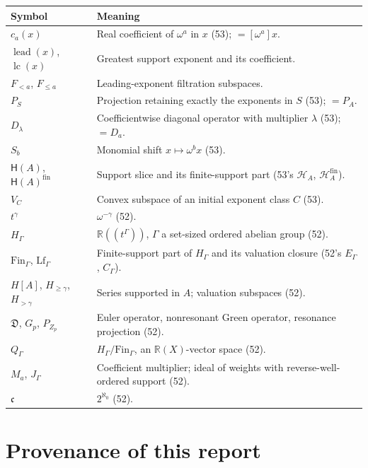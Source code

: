\documentclass[11pt,letterpaper]{article}
\numberwithin{equation}{section}
\theoremstyle{definition}
\theoremstyle{remark}
\newcommand{\R}{\mathbb{R}}
\newcommand{\Hahn}{\mathsf{H}}
\newcommand{\lead}{\operatorname{lead}}
\newcommand{\ct}{\operatorname{ct}}
\newcommand{\lc}{\operatorname{lc}}
\newcommand{\cont}{\mathfrak c}%
\newcommand{\EuD}{\mathfrak D}%
\newcommand{\FinS}[1]{\mathrm{Fin}_{#1}}%
\newcommand{\LfS}[1]{\mathrm{Lf}_{#1}}%
\begin{document}
\begin{center}
\small
\begin{tabularx}{0.96\textwidth}{L{0.24\textwidth}Y}
\toprule
Symbol & Meaning\\
\midrule
\(c_a(x)\) & Real coefficient of \(\omega^a\) in \(x\) (53); \(=[\omega^a]x\).\\
\(\lead(x)\), \(\lc(x)\) & Greatest support exponent and its coefficient.\\
\(F_{<a}\), \(F_{\le a}\) & Leading-exponent filtration subspaces.\\
\(P_S\) & Projection retaining exactly the exponents in \(S\) (53); \(=P_A\).\\
\(D_\lambda\) & Coefficientwise diagonal operator with multiplier \(\lambda\) (53); \(=D_a\).\\
\(S_b\) & Monomial shift \(x\mapsto\omega^bx\) (53).\\
\(\Hahn(A)\), \(\Hahn(A)^{\mathrm{fin}}\) & Support slice and its finite-support part (53's \(\mathcal H_A\), \(\mathcal H_A^{\mathrm{fin}}\)).\\
\(V_C\) & Convex subspace of an initial exponent class \(C\) (53).\\
\(t^\gamma\) & \(\omega^{-\gamma}\) (52).\\
\(H_\Gamma\) & \(\R((t^\Gamma))\), \(\Gamma\) a set-sized ordered abelian group (52).\\
\(\FinS\Gamma\), \(\LfS\Gamma\) & Finite-support part of \(H_\Gamma\) and its valuation closure (52's \(E_\Gamma\), \(C_\Gamma\)).\\
\(H[A]\), \(H_{\ge\gamma}\), \(H_{>\gamma}\) & Series supported in \(A\); valuation subspaces (52).\\
\(\EuD\), \(G_p\), \(P_{Z_p}\) & Euler operator, nonresonant Green operator, resonance projection (52).\\
\(Q_\Gamma\) & \(H_\Gamma/\FinS\Gamma\), an \(\R(X)\)-vector space (52).\\
\(M_a\), \(J_\Gamma\) & Coefficient multiplier; ideal of weights with reverse-well-ordered support (52).\\
\(\cont\) & \(2^{\aleph_0}\) (52).\\
\bottomrule
\end{tabularx}
\end{center}


\section{Provenance of this report}\label{rvs:w:app:provenance}
\end{document}
